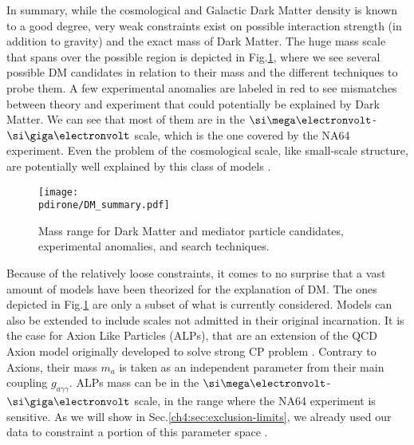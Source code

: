 In summary, while the cosmological and Galactic Dark Matter density is known to a good degree, very weak constraints exist on  possible interaction strength (in addition to gravity) and the exact mass of Dark Matter. The huge mass scale that spans over the possible region is depicted in Fig.\ref{fig:dm-mass-range}, where we see several possible DM candidates in relation to their mass and the different techniques to probe them. A few experimental anomalies are labeled in red to see mismatches between theory and experiment that could potentially be explained by Dark Matter. We can see that most of them are in the $\mev$-$\gev$ scale, which is the one covered by the NA64 experiment. Even the problem of the cosmological scale, like small-scale structure, are potentially well explained by this class of models \cite{battaglieri2017cosmic}.

\begin{figure}[bht!]
  \centering
  \texttt{[image: \\pdirone/DM\_summary.pdf]}
  \caption[Mass range for Dark Matter]{Mass range for Dark Matter and mediator particle candidates, experimental anomalies, and search techniques.}
  \label{fig:dm-mass-range}
\end{figure}

Because of the relatively loose constraints, it comes to no surprise that a vast amount of models have been theorized for the explanation of DM. The ones depicted in Fig.\ref{fig:dm-mass-range} are only a subset of what is currently considered. Models can also be extended to include scales not admitted in their original incarnation. It is the case for Axion Like Particles (ALPs), that are an extension of the QCD Axion model originally developed to solve strong CP problem \cite{PhysRevD.16.1791}. Contrary to Axions, their mass $m_a$ is taken as an independent parameter from their main coupling $g_{a \gamma \gamma}$. ALPs mass can  be in the $\mev$-$\gev$ scale, in the range where the NA64 experiment is sensitive. As we will show in Sec.\ref{ch4:sec:exclusion-limits}, we already used our data to constraint a portion of this parameter space \cite{Banerjee:2020fue}.

